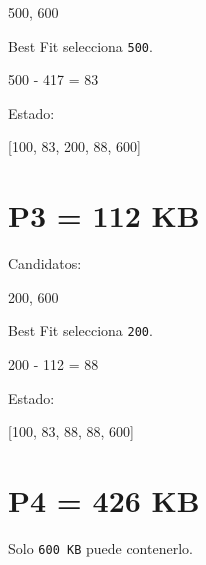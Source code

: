 \documentclass[
  spanish,
  letterpaper,
]{scrbook}
\newenvironment{Shaded}{\begin{snugshade}}{\end{snugshade}}
\newcommand{\NormalTok}[1]{\textcolor[rgb]{0.00,0.23,0.31}{#1}}
\begin{document}
\begin{Shaded}
\begin{Highlighting}[]
\NormalTok{500, 600}
\end{Highlighting}
\end{Shaded}

Best Fit selecciona \texttt{500}.

\begin{Shaded}
\begin{Highlighting}[]
\NormalTok{500 {-} 417 = 83}
\end{Highlighting}
\end{Shaded}

Estado:

\begin{Shaded}
\begin{Highlighting}[]
\NormalTok{[100, 83, 200, 88, 600]}
\end{Highlighting}
\end{Shaded}

\section{P3 = 112 KB}\label{p3-112-kb-1}

Candidatos:

\begin{Shaded}
\begin{Highlighting}[]
\NormalTok{200, 600}
\end{Highlighting}
\end{Shaded}

Best Fit selecciona \texttt{200}.

\begin{Shaded}
\begin{Highlighting}[]
\NormalTok{200 {-} 112 = 88}
\end{Highlighting}
\end{Shaded}

Estado:

\begin{Shaded}
\begin{Highlighting}[]
\NormalTok{[100, 83, 88, 88, 600]}
\end{Highlighting}
\end{Shaded}

\section{P4 = 426 KB}\label{p4-426-kb-1}

Solo \texttt{600\ KB} puede contenerlo.
\end{document}
